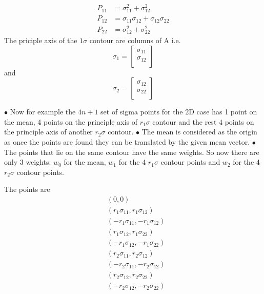 \documentclass[landscape]{slides}
\begin{document}
\begin{slide} 
 \begin{align*}
 P_{11}&=\sigma_{11}^2+\sigma_{12}^2\\
 P_{12}&=\sigma_{11}\sigma_{12}+\sigma_{12}\sigma_{22}\\
 P_{22}&=\sigma_{12}^2+\sigma_{22}^2
 \end{align*}
 The priciple axis of the $1\sigma$ contour are columns of A i.e.
 \[\sigma_1=\left[ {\begin{array}{c}
 \sigma_{11}  \\
 \sigma_{12}  \\
 \end{array} } \right]\]
 and
  \[\sigma_2=\left[ {\begin{array}{c}
 \sigma_{12}  \\
 \sigma_{22}  \\
 \end{array} } \right]\]
 	\end{slide}
\begin{slide}
 $\bullet$ Now for example the $4n+1$ set of sigma points for the 2D case has 1 point on the mean, 4 points on the principle axis of  $r_1\sigma$ contour and the rest 4 points on the principle axis of another $r_2\sigma$ contour.\newline\newline 
 $\bullet$ The mean is considered as the origin as once the points are found they can be translated by the given mean vector. \newline\newline
 $\bullet$ The points that lie on the same contour have the same weights. So now there are only 3 weights:  $w_0$ for the mean, $w_1$ for the 4 $r_1\sigma$ contour points and $w_2$ for the 4 $r_2\sigma$ contour points. 
 \end{slide}
 \begin{slide}
 The points are
 \begin{align*}
 &(0,0)\\
 &(r_1\sigma_{11},r_1\sigma_{12})\\
 &(-r_1\sigma_{11},-r_1\sigma_{12})\\
 &(r_1\sigma_{12},r_1\sigma_{22})\\
 &(-r_1\sigma_{12},-r_1\sigma_{22})\\
 &(r_2\sigma_{11},r_2\sigma_{12})\\
 &(-r_2\sigma_{11},-r_2\sigma_{12})\\
 &(r_2\sigma_{12},r_2\sigma_{22})\\
 &(-r_2\sigma_{12},-r_2\sigma_{22})
 \end{align*}
   	\end{slide}
\end{document}
